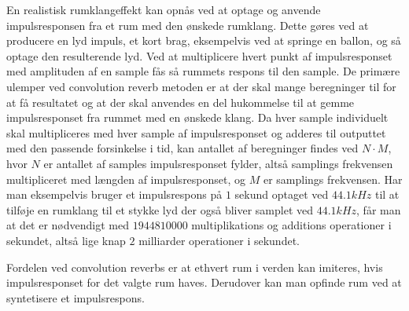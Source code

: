En realistisk rumklangeffekt kan opnås ved at optage og anvende impulsresponsen fra et rum med den ønskede rumklang.
Dette gøres ved at producere en lyd impuls, et kort brag, eksempelvis ved at springe en ballon, og så optage den resulterende lyd. 
Ved at multiplicere hvert punkt af impulsresponset med amplituden af en sample fås så rummets respons til den sample.
De primære ulemper ved convolution reverb metoden er at der skal mange beregninger til for at få resultatet og at der skal anvendes en del hukommelse til at gemme impulsresponset fra rummet med en ønskede klang.
Da hver sample individuelt skal multipliceres med hver sample af impulsresponset og adderes til outputtet med den passende forsinkelse i tid, kan antallet af beregninger findes ved $N \cdot M$, hvor $N$ er antallet af samples impulsresponset fylder, altså samplings frekvensen multipliceret med længden af impulsresponset, og $M$ er samplings frekvensen.
Har man eksempelvis bruger et impulsrespons på $1$ sekund optaget ved $44.1\si{kHz}$ til at tilføje en rumklang til et stykke lyd der også bliver samplet ved $44.1\si{kHz}$, får man at det er nødvendigt med $1944810000$ multiplikations og additions  operationer i sekundet, altså lige knap $2$ milliarder operationer i sekundet. 

Fordelen ved convolution reverbs er at ethvert rum i verden kan imiteres, hvis impulsresponset for det valgte rum haves.\newline
Derudover kan man opfinde rum ved at syntetisere et impulsrespons.

